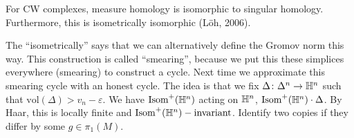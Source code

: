 \begin{theorem}
    For CW complexes, measure homology is isomorphic to singular homology. Furthermore, this is isometrically isomorphic (L\"oh, 2006).
\end{theorem}
The ``isometrically'' says that we can alternatively define the Gromov norm this way. This construction is called ``smearing'', because we put this these simplices everywhere (smearing) to construct a cycle. Next time we approximate this smearing cycle with an honest cycle. The idea is that we fix $\Delta \colon \Delta ^n  \to \mathbb{H}^n $ such that $\mathrm{vol}(\Delta )> v_n -\varepsilon $. We have $\mathrm{Isom}^+(\mathbb{H}^n ) $ acting on $\mathbb{H}^n $, $\mathrm{Isom}^+(\mathbb{H}^n ) \cdot \Delta $. By Haar, this is locally finite and $\mathrm{Isom}^+(\mathbb{H}^n )- \mathrm{invariant}$. Identify two copies if they differ by some $g \in \pi_1(M)$.
